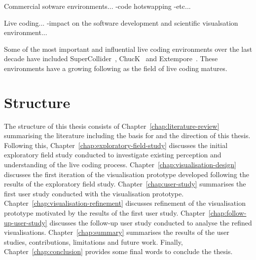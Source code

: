 Commercial sotware environments...
-code hotswapping
-etc...

Live coding...
-impact on the software development and scientific visualsation environment...

Some of the most important and influential live coding environments over the last decade have included SuperCollider~\cite{McCartney}, ChucK~\cite{Wang2008} and Extempore~\cite{Sorensen}. These environments have a growing following as the field of live coding matures.




\section{Structure}

The structure of this thesis consists of Chapter~\ref{chap:literature-review} summarising the literature including the basis for and the direction of this thesis. Following this, Chapter~\ref{chap:exploratory-field-study} discusses the initial exploratory field study conducted to investigate existing perception and understanding of the live coding process. Chapter~\ref{chap:visualisation-design} discusses the first iteration of the visualisation prototype developed following the results of the exploratory field study. Chapter~\ref{chap:user-study} summarises the first user study conducted with the visualisation prototype. Chapter~\ref{chap:visualisation-refinement} discusses refinement of the visualisation prototype motivated by the results of the first user study. Chapter~\ref{chap:follow-up-user-study} discusses the follow-up user study conducted to analyse the refined visualisations. Chapter~\ref{chap:summary} summarises the results of the user studies, contributions, limitations and future work. Finally, Chapter~\ref{chap:conclusion} provides some final words to conclude the thesis.


